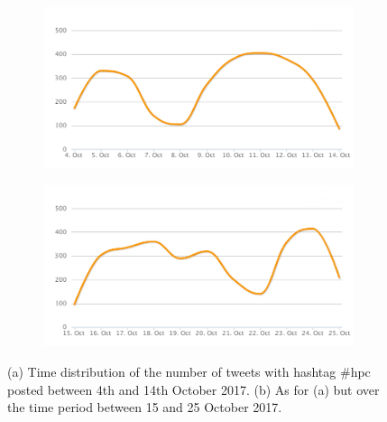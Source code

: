 \begin{figure}
 \centering
 \begin{subfigure}[b]{0.9\textwidth}
   \includegraphics[width=1\linewidth]{Images/FirstSearch_HPC.png}
   \caption{} 
 \end{subfigure}

 \begin{subfigure}[b]{0.9\textwidth}
   \includegraphics[width=1\linewidth]{Images/SecondSearch_HPC.png}
   \caption{}
 \end{subfigure}
 \caption{(a) Time distribution of the number of tweets with hashtag \#hpc posted between 4th and 14th October 2017. (b) As for (a) but over the time period between 15 and 25 October 2017.} 
 \label{First-SecondSearch_HPC}
\end{figure}

